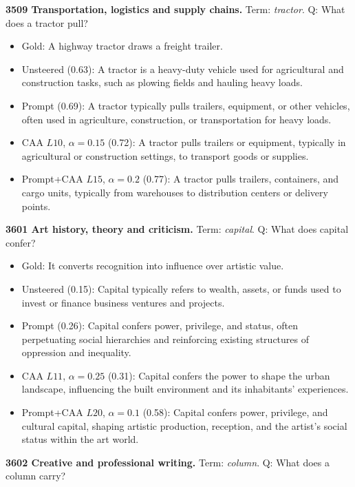 \medskip\noindent\textbf{3509 Transportation, logistics and supply chains.} Term: \emph{tractor}.
Q: What does a tractor pull?
\begin{itemize}\setlength{\itemsep}{0.15em}\setlength{\parsep}{0pt}\setlength{\topsep}{0.2em}
\item Gold: A highway tractor draws a freight trailer.
\item Unsteered (0.63): A tractor is a heavy-duty vehicle used for agricultural and construction tasks, such as plowing fields and hauling heavy loads.
\item Prompt (0.69): A tractor typically pulls trailers, equipment, or other vehicles, often used in agriculture, construction, or transportation for heavy loads.
\item CAA $L10$, $\alpha=0.15$ (0.72): A tractor pulls trailers or equipment, typically in agricultural or construction settings, to transport goods or supplies.
\item Prompt+CAA $L15$, $\alpha=0.2$ (0.77): A tractor pulls trailers, containers, and cargo units, typically from warehouses to distribution centers or delivery points.
\end{itemize}
\medskip\noindent\textbf{3601 Art history, theory and criticism.} Term: \emph{capital}.
Q: What does capital confer?
\begin{itemize}\setlength{\itemsep}{0.15em}\setlength{\parsep}{0pt}\setlength{\topsep}{0.2em}
\item Gold: It converts recognition into influence over artistic value.
\item Unsteered (0.15): Capital typically refers to wealth, assets, or funds used to invest or finance business ventures and projects.
\item Prompt (0.26): Capital confers power, privilege, and status, often perpetuating social hierarchies and reinforcing existing structures of oppression and inequality.
\item CAA $L11$, $\alpha=0.25$ (0.31): Capital confers the power to shape the urban landscape, influencing the built environment and its inhabitants' experiences.
\item Prompt+CAA $L20$, $\alpha=0.1$ (0.58): Capital confers power, privilege, and cultural capital, shaping artistic production, reception, and the artist's social status within the art world.
\end{itemize}
\medskip\noindent\textbf{3602 Creative and professional writing.} Term: \emph{column}.
Q: What does a column carry?
